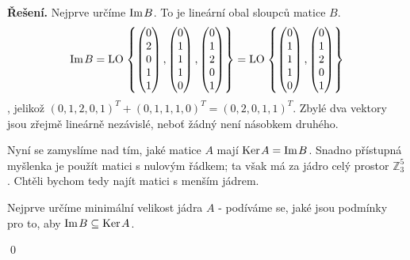 \documentclass{article}
\theoremstyle{definition}
\theoremstyle{plain}
\newcommand{\Z}{\mathbb{Z}}
\newcommand{\vker}{\text{Ker\hspace{0.1em}}}
\newcommand{\vim}{\text{Im\hspace{0.1em}}}
\newcommand{\LO}{\text{LO\hspace{0.1em}}}
\newenvironment{reseni}{\noindent\textbf{Řešení.}\hspace{0.5em}}{\hfill\qed\medskip}
\begin{document}
\begin{reseni}
Nejprve určíme $\vim B$. To je lineární obal sloupců matice $B$.
\[
\vim B = \LO \left\{ \begin{pmatrix} 0 \\ 2 \\ 0 \\ 1 \\ 1 \end{pmatrix}, \begin{pmatrix} 0 \\ 1 \\ 1 \\ 1 \\ 0 \end{pmatrix}, \begin{pmatrix} 0 \\ 1 \\ 2 \\ 0 \\ 1 \end{pmatrix} \right\} = \LO \left\{ \begin{pmatrix} 0 \\ 1 \\ 1 \\ 1 \\ 0 \end{pmatrix}, \begin{pmatrix} 0 \\ 1 \\ 2 \\ 0 \\ 1 \end{pmatrix} \right\}
\], jelikož $(0,1,2,0,1)^T + (0,1,1,1,0)^T = (0,2,0,1,1)^T$. Zbylé dva vektory jsou zřejmě lineárně nezávislé, neboť žádný není násobkem druhého.

Nyní se zamyslíme nad tím, jaké matice $A$ mají $\vker A = \vim B$. 
Snadno přístupná myšlenka je použít matici s nulovým řádkem; ta však má za jádro celý prostor $\Z_3^5$.
Chtěli bychom tedy najít matici s menším jádrem. 

Nejprve určíme minimální velikost jádra $A$ - podíváme se, jaké jsou podmínky pro to, aby $\vim B \subseteq \vker A$. 


\end{reseni}
\end{document}
